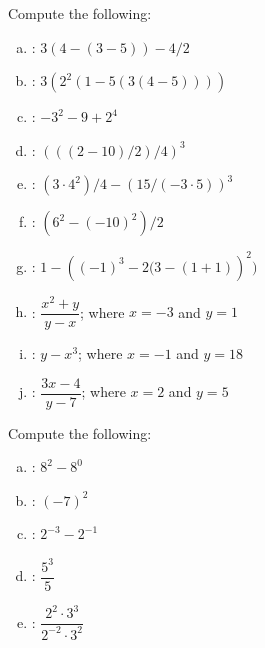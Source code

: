 \documentclass[11pt,letterpaper]{article}
\begin{document}
\newpage



 Compute the following: \pvspace{0.2cm}
\begin{enumerate}[(a)] \itemsep=2ex
\item {}: \qquad $3 \left( 4 - \left(3 - 5 \right) \right) - 4/2$
\item {}: \qquad $3 \left( 2^2 \left( 1 - 5 \left( 3 \left(4 - 5 \right) \right) \right) \right)$
\item {}: \qquad $-3^2 - 9 + 2^4$
\item {}: \qquad $\left( \left( (2 - 10 ) / 2 \right) / 4 \right)^3$
\item {}: \qquad $(3 \cdot 4^2)/4 - \left(15 / \left(-3 \cdot 5 \right) \right)^3$
\item {}: \qquad $\left(6^2 - (-10)^2 \right)/2$
\item {}: \qquad $1 - \left( (-1)^3 - 2(3 - (1 +1) \right)^2 )$
\item {}: \qquad $\dfrac{x^2 + y}{y - x}$; where $x= -3$ and $y= 1$
\item {}: \qquad $y - x^3$; where $x= -1$ and $y= 18$
\item {}: \qquad $\dfrac{3x - 4}{y - 7}$; where $x= 2$ and $y= 5$
\end{enumerate}



\vfill



 Compute the following: \pvspace{0.2cm}
\begin{enumerate}[(a)] \itemsep=2ex
\item {}: \qquad $8^2 - 8^0$
\item {}: \qquad $(-7)^2$
\item {}: \qquad $2^{-3} - 2^{-1}$
\item {}: \qquad $\dfrac{5^3}{5}$
\item {}: \qquad $\dfrac{2^2 \cdot 3^3}{2^{-2} \cdot 3^2}$
\end{enumerate}



\vfill
\newpage
\end{document}
